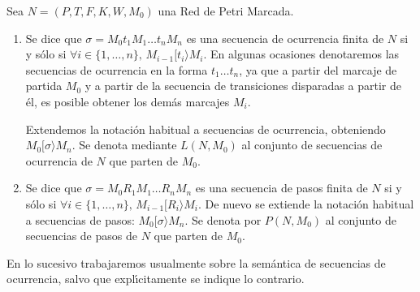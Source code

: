 \begin{definition} Sea $N=(P,T,F,K,W,M_0)$ una Red de Petri Marcada.
\begin{enumerate}
\item Se dice que $\sigma = M_0 t_1 M_1 \ldots t_n M_n$ es una
secuencia de ocurrencia finita de $N$ si y s\'{o}lo si
$\forall i \in \{1,\ldots,n\},\,M_{i-1} [ t_i \rangle M_i$.
En algunas ocasiones denotaremos las secuencias de ocurrencia
en la forma $t_1 \ldots t_n$, ya que a partir del marcaje de partida
$M_0$ y a partir de la secuencia de transiciones disparadas a partir de \'{e}l,
es posible obtener los dem\'{a}s marcajes $M_i$.

Extendemos la notaci\'{o}n habitual a
secuencias de ocurrencia, obteniendo $M_0 [ \sigma \rangle M_n$.
Se denota mediante $L(N,M_0)$ al
conjunto de secuencias de ocu\-rren\-cia de $N$ que parten de $M_0$.
\item Se dice que $\sigma = M_0 R_1 M_1 \ldots R_n M_n$ es una
secuencia de pasos finita de $N$ si y s\'{o}lo si
$\forall i \in \{1,\ldots,n\},\,M_{i-1} [ R_i \rangle M_i$.
De nuevo se extiende la notaci\'{o}n habitual a secuencias de pasos:
$M_0 [ \sigma \rangle M_n$.
Se denota por $P(N,M_0)$ al conjunto de secuencias de pasos de $N$
que parten de $M_0$.
\end{enumerate}
\end{definition}

En lo sucesivo trabajaremos usualmente sobre la sem\'{a}ntica de
secuencias de ocurrencia, salvo que expl\'{\i}citamente se
indique lo contrario.


